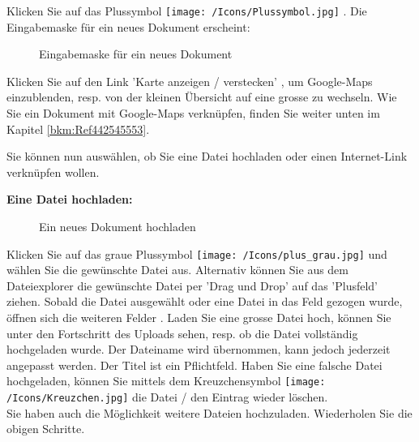 Klicken Sie auf das Plussymbol \texttt{[image: /Icons/Plussymbol.jpg]} . Die Eingabemaske für ein neues Dokument erscheint:

\begin{figure}[H]
\caption{Eingabemaske für ein neues Dokument}
\end{figure}

Klicken Sie auf den Link 'Karte anzeigen / verstecken' , um Google-Maps einzublenden, resp. von der kleinen Übersicht auf eine grosse zu wechseln. Wie Sie ein Dokument mit Google-Maps verknüpfen, finden Sie weiter unten im Kapitel \ref{bkm:Ref442545553}. \newline

Sie können nun auswählen, ob Sie eine Datei hochladen  oder einen Internet-Link verknüpfen  wollen.

\vspace{\baselineskip}

\textbf{Eine Datei hochladen:} 
\begin{figure}[H]
\caption{Ein neues Dokument hochladen}
\end{figure}

Klicken Sie auf das graue Plussymbol \texttt{[image: /Icons/plus\_grau.jpg]}  und wählen Sie die gewünschte Datei aus. Alternativ können Sie aus dem Dateiexplorer die gewünschte Datei per 'Drag und Drop' auf das 'Plusfeld' ziehen. Sobald die Datei ausgewählt oder eine Datei in das Feld gezogen wurde, öffnen sich die weiteren Felder . Laden Sie eine grosse Datei hoch, können Sie unter  den Fortschritt des Uploads sehen, resp. ob die Datei vollständig hochgeladen wurde. Der Dateiname  wird übernommen, kann jedoch jederzeit angepasst werden. Der Titel ist ein Pflichtfeld. Haben Sie eine falsche Datei hochgeladen, können Sie mittels dem Kreuzchensymbol \texttt{[image: /Icons/Kreuzchen.jpg]}  die Datei / den Eintrag wieder löschen. \\
Sie haben auch die Möglichkeit weitere Dateien hochzuladen. Wiederholen Sie die obigen Schritte.

